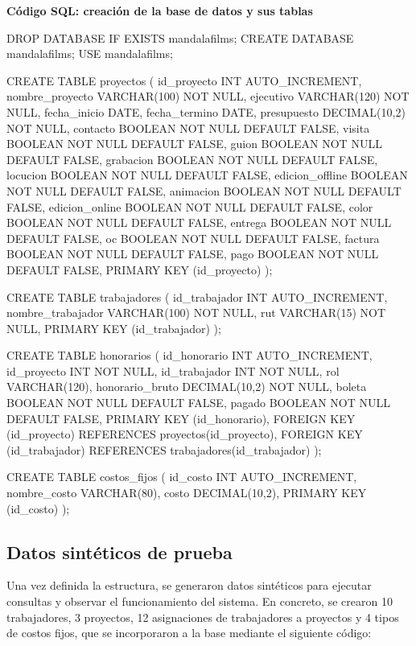 \documentclass[11pt,letterpaper]{article}
\newcommand{\rotuloSQL}[1]{\par\noindent\textcolor{azulPrimario}{\bfseries #1}\par\vspace{-2pt}}
\begin{document}
\rotuloSQL{Código SQL: creación de la base de datos y sus tablas}
\begin{SQL}
DROP DATABASE IF EXISTS mandalafilms;
CREATE DATABASE mandalafilms;
USE mandalafilms;

CREATE TABLE proyectos (
id_proyecto INT AUTO_INCREMENT,
nombre_proyecto VARCHAR(100) NOT NULL,
ejecutivo VARCHAR(120) NOT NULL,
fecha_inicio DATE,
fecha_termino DATE,
presupuesto DECIMAL(10,2) NOT NULL,
contacto BOOLEAN NOT NULL DEFAULT FALSE,
visita BOOLEAN NOT NULL DEFAULT FALSE,
guion BOOLEAN NOT NULL DEFAULT FALSE,
grabacion BOOLEAN NOT NULL DEFAULT FALSE,
locucion BOOLEAN NOT NULL DEFAULT FALSE,
edicion_offline BOOLEAN NOT NULL DEFAULT FALSE,
animacion BOOLEAN NOT NULL DEFAULT FALSE,
edicion_online BOOLEAN NOT NULL DEFAULT FALSE,
color BOOLEAN NOT NULL DEFAULT FALSE,
entrega BOOLEAN NOT NULL DEFAULT FALSE,
oc BOOLEAN NOT NULL DEFAULT FALSE,
factura BOOLEAN NOT NULL DEFAULT FALSE,
pago BOOLEAN NOT NULL DEFAULT FALSE,
PRIMARY KEY (id_proyecto)
);

CREATE TABLE trabajadores (
id_trabajador INT AUTO_INCREMENT,
nombre_trabajador VARCHAR(100) NOT NULL,
rut VARCHAR(15) NOT NULL,
PRIMARY KEY (id_trabajador)
);

CREATE TABLE honorarios (
id_honorario INT AUTO_INCREMENT,
id_proyecto INT NOT NULL,
id_trabajador INT NOT NULL,
rol VARCHAR(120),
honorario_bruto DECIMAL(10,2) NOT NULL,
boleta BOOLEAN NOT NULL DEFAULT FALSE,
pagado BOOLEAN NOT NULL DEFAULT FALSE,
PRIMARY KEY (id_honorario),
FOREIGN KEY (id_proyecto) REFERENCES proyectos(id_proyecto),
FOREIGN KEY (id_trabajador) REFERENCES trabajadores(id_trabajador)
);

CREATE TABLE costos_fijos (
id_costo INT AUTO_INCREMENT,
nombre_costo VARCHAR(80),
costo DECIMAL(10,2),
PRIMARY KEY (id_costo)
);
\end{SQL}


\subsection{Datos sintéticos de prueba}

Una vez definida la estructura, se generaron datos sintéticos para ejecutar consultas y observar el funcionamiento del sistema. En concreto, se crearon 10 trabajadores, 3 proyectos, 12 asignaciones de trabajadores a proyectos y 4 tipos de costos fijos, que se incorporaron a la base mediante el siguiente código:
\end{document}
